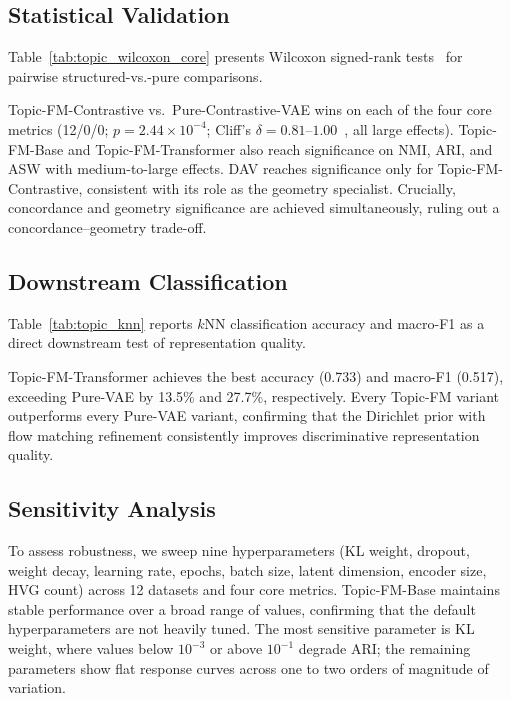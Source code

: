 \documentclass[biology,article,submit,pdftex,moreauthors]{Definitions/mdpi}
\begin{document}
\subsection{Statistical Validation}
Table~\ref{tab:topic_wilcoxon_core} presents Wilcoxon signed-rank tests~\cite{wilcoxon1945individual} for pairwise structured-vs.-pure comparisons.



Topic-FM-Contrastive vs.\ Pure-Contrastive-VAE wins on each of the four core metrics (12/0/0; $p = 2.44\times10^{-4}$; Cliff's $\delta = 0.81$--$1.00$~\cite{cliff1993dominance}, all large effects). Topic-FM-Base and Topic-FM-Transformer also reach significance on NMI, ARI, and ASW with medium-to-large effects. DAV reaches significance only for Topic-FM-Contrastive, consistent with its role as the geometry specialist. Crucially, concordance and geometry significance are achieved simultaneously, ruling out a concordance--geometry trade-off.

\subsection{Downstream Classification}
Table~\ref{tab:topic_knn} reports $k$NN classification accuracy and macro-F1 as a direct downstream test of representation quality.



Topic-FM-Transformer achieves the best accuracy (0.733) and macro-F1 (0.517), exceeding Pure-VAE by 13.5\% and 27.7\%, respectively. Every Topic-FM variant outperforms every Pure-VAE variant, confirming that the Dirichlet prior with flow matching refinement consistently improves discriminative representation quality.

\subsection{Sensitivity Analysis}
To assess robustness, we sweep nine hyperparameters (KL weight, dropout, weight decay, learning rate, epochs, batch size, latent dimension, encoder size, HVG count) across 12 datasets and four core metrics. Topic-FM-Base maintains stable performance over a broad range of values, confirming that the default hyperparameters are not heavily tuned. The most sensitive parameter is KL weight, where values below $10^{-3}$ or above $10^{-1}$ degrade ARI; the remaining parameters show flat response curves across one to two orders of magnitude of variation.
\end{document}
